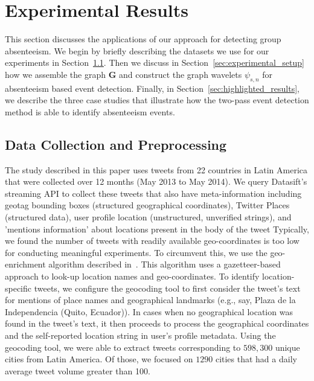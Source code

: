 \section{Experimental Results} \label{sec:experiment}
This section discusses the applications of our approach for detecting group absenteeism.
We begin by briefly describing the datasets we use for our experiments in Section~\ref{sec:data_collection}.
Then we discuss in Section~\ref{sec:experimental_setup} how we assemble the graph $\mathbf{G}$ and construct the graph wavelets $\psi_{s,n}$ for absenteeism based event detection.
Finally, in Section~\ref{sec:highlighted_results}, we describe the three case studies that illustrate how the two-pass event detection method is able to identify  absenteeism events.
\subsection{Data Collection and Preprocessing}
\label{sec:data_collection}
The study described in this paper uses tweets from 22 countries in Latin America that were collected over 12 months (May 2013 to May 2014).
We query Datasift's streaming API to collect these tweets that also have meta-information including geotag bounding boxes (structured geographical coordinates), Twitter Places (structured data), user profile location (unstructured, unverified strings), and 'mentions information' about locations present in the body of the tweet
Typically, we found the number of tweets with readily available geo-coordinates is too low for conducting meaningful experiments.
To circumvent this, we use the geo-enrichment algorithm described in~\cite{ramakrishnan2014beating}.
This algorithm uses a gazetteer-based approach to look-up location names and geo-coordinates.
To identify  location-specific tweets, we configure the geocoding tool to first consider the tweet's text for mentions of place names and geographical landmarks (e.g., say, Plaza de la Independencia (Quito, Ecuador)).
In cases when no geographical location was found in the tweet's text, it then proceeds to process the geographical coordinates and the self-reported location string in user's profile metadata.
Using the geocoding tool, we were able to extract tweets corresponding to $598,300$ unique cities from Latin America.
Of those, we focused on $1290$ cities that had a daily average tweet volume greater than 100.

